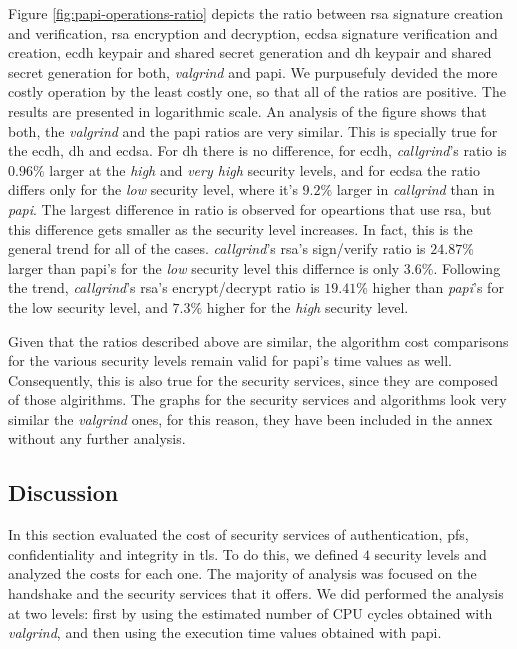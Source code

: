 Figure \ref{fig:papi-operations-ratio} depicts the ratio between \gls{rsa} signature creation and verification, \gls{rsa}
encryption and decryption, \gls{ecdsa} signature verification and creation, \gls{ecdh} keypair and shared secret generation and
\gls{dh} keypair and shared secret generation for both, \textit{valgrind} and \gls{papi}. We purpusefuly devided the more
costly operation by the least costly one, so that all of the ratios are positive. The results are presented in logarithmic scale. An analysis of the figure shows that
both, the \textit{valgrind} and the \gls{papi} ratios are very similar. This is specially true for the \gls{ecdh}, \gls{dh}
and \gls{ecdsa}. For \gls{dh} there is no difference, for \gls{ecdh}, \textit{callgrind}'s ratio is $0.96\%$ larger at the \textit{high} and
\textit{very high} security levels, and for \gls{ecdsa} the ratio differs only for the \textit{low} 
security level, where it's $9.2\%$ larger in \textit{callgrind} than in \textit{papi}. The largest difference in ratio
is observed for opeartions that use \gls{rsa}, but this difference gets smaller as the security level increases. In fact,
this is the general trend for all of the cases. \textit{callgrind}'s \gls{rsa}'s sign/verify ratio is $24.87\%$ larger than \gls{papi}'s
for the \textit{low} security level this differnce is only $3.6\%$. Following the trend, \textit{callgrind}'s \gls{rsa}'s encrypt/decrypt ratio is $19.41\%$ higher
than \textit{papi}'s for the low security level, and $7.3\%$ higher for the \textit{high} security level.

Given that the ratios described above are similar, the algorithm cost comparisons for the various security levels remain valid for \gls{papi}'s time values as well.
Consequently, this is also true for the security services, since they are composed of those algirithms. The graphs for the security services and algorithms look very similar
the \textit{valgrind} ones, for this reason, they have been included in the annex without any further analysis.

\subsection{Discussion} \label{sec:ss-cost-conclusions}

In this section evaluated the cost of security services of authentication, \gls{pfs}, confidentiality and integrity
in \gls{tls}. To do this, we defined $4$ security levels and analyzed the costs for each one. The majority of
analysis was focused on the handshake and the security services that it offers. We did performed the analysis at
two levels: first by using the estimated number of CPU cycles obtained with \textit{valgrind}, and then using the
execution time values obtained with \gls{papi}.

